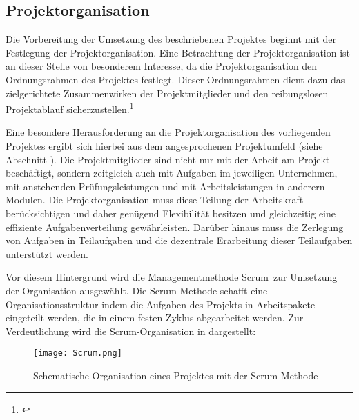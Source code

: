 \subsection{Projektorganisation}
\label{sec:Projektorganisation}

Die Vorbereitung der Umsetzung des beschriebenen Projektes beginnt mit der Festlegung der Projektorganisation.
Eine Betrachtung der Projektorganisation ist an dieser Stelle von besonderem Interesse, da die Projektorganisation
den Ordnungsrahmen des Projektes festlegt.
Dieser Ordnungsrahmen dient dazu das zielgerichtete Zusammenwirken
der Projektmitglieder und den reibungslosen Projektablauf sicherzustellen.\footnote{\citet[S.~15]{geiger2009}}

Eine besondere Herausforderung an die Projektorganisation des vorliegenden Projektes ergibt sich hierbei
aus dem angesprochenen Projektumfeld (siehe Abschnitt ). Die Projektmitglieder sind
nicht nur mit der Arbeit am Projekt beschäftigt, sondern zeitgleich auch mit Aufgaben im jeweiligen
Unternehmen, mit anstehenden Prüfungsleistungen und mit Arbeitsleistungen in anderern Modulen.
Die Projektorganisation muss diese Teilung der Arbeitskraft berücksichtigen und daher genügend Flexibilität
besitzen und gleichzeitig eine effiziente Aufgabenverteilung gewährleisten. Darüber hinaus muss
die Zerlegung von Aufgaben in Teilaufgaben und die dezentrale Erarbeitung dieser Teilaufgaben unterstützt werden.

Vor diesem Hintergrund wird die Managementmethode Scrum\footnotemark\ zur Umsetzung der Organisation ausgewählt.
Die Scrum-Methode schafft eine Organisationsstruktur indem die Aufgaben des Projekts in Arbeitspakete eingeteilt werden,
die in einem festen Zyklus abgearbeitet werden. Zur Verdeutlichung wird die Scrum-Organisation in 
dargestellt:


\clearpage
\begin{figure}[htb] 
\centering
\texttt{[image: Scrum.png]}
\caption[Scrum-Organisation]{Schematische Organisation eines Projektes mit der Scrum-Methode\protect\footnotemark}
\label{fig:Scrum}
\end{figure}

